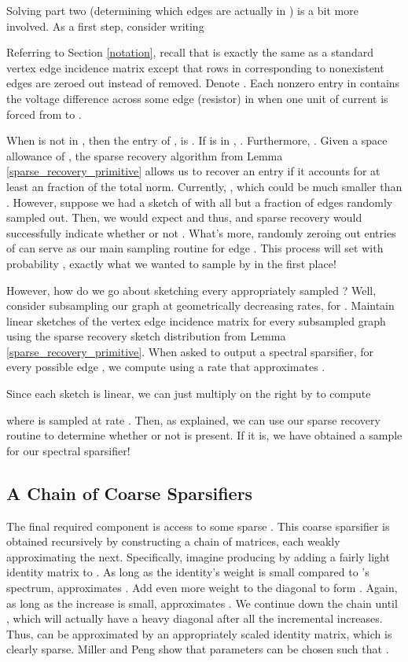 \documentclass[11pt]{article}
\begin{document}
Solving part two (determining which edges are actually in ) is a bit more involved.
As a first step, consider writing

Referring to Section \ref{notation}, recall that  is exactly the same as a standard vertex edge incidence matrix except that rows in  corresponding to nonexistent edges are zeroed out instead of removed. Denote . Each nonzero entry in  contains the voltage difference across some edge (resistor) in  when one unit of current is forced from  to . 

When  is not in , then the  entry of ,   is . If  is in , . Furthermore, . 
Given a space allowance of , the sparse recovery algorithm from Lemma \ref{sparse_recovery_primitive} allows us to recover an entry if it accounts for at least an  fraction of the total  norm. Currently, , which could be much smaller than . However, suppose we had a sketch of  with all but a  fraction of edges randomly sampled out. Then, we would expect  and
thus,  and sparse recovery would successfully indicate whether or not . What's more, randomly zeroing out entries of  can serve as our main sampling routine for edge . This process will set  with probability , exactly what we wanted to sample by in the first place!

However, how do we go about sketching every appropriately sampled ? Well, consider subsampling our graph at geometrically decreasing rates,  for . Maintain linear sketches  of the vertex edge incidence matrix for every subsampled graph using the  sparse recovery sketch distribution from Lemma \ref{sparse_recovery_primitive}.
When asked to output a spectral sparsifier, for every possible edge , we compute using  a rate  that approximates . 

Since each sketch is linear, 
we can just multiply  on the right by  to compute

where  is  sampled at rate . 
Then, as explained, we can use our sparse recovery routine to determine whether or not  is present. If it is, we have obtained a sample for our spectral sparsifier!

\subsection{A Chain of Coarse Sparsifiers}
The final required component is access to some sparse . This coarse sparsifier is obtained recursively by constructing a chain of matrices,  each weakly approximating the next. Specifically, imagine producing  by adding a fairly light identity matrix to . As long as the identity's weight is small compared to 's spectrum,  approximates . Add even more weight to the diagonal to form . Again, as long as the increase is small,  approximates . We continue down the chain until , which will actually have a heavy diagonal after all the incremental increases. Thus,  can be approximated by an appropriately scaled identity matrix, which is clearly sparse. Miller and Peng show that parameters can be chosen such that  \cite{pengV1}.
\end{document}
